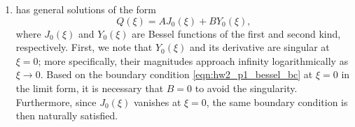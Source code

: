 \begin{enumerate}[(i)]
{\begin{enumerate}[(1)]
{\begin{equation}
\begin{aligned}
        &= k^2n^2 {\left(\frac{\xi}{k}\right)}^{2-\frac{1}{n}} \frac{d^2 Q}{d\xi^2} + kn^2 {\left(\frac{\xi}{k}\right)}^{1-\frac{1}{n}} \frac{dQ}{d\xi} + \frac{\omega^2}{g}Q ~~~~ \left[\textrm{multiply by } \frac{1}{n^2} {\left(\frac{\xi}{k}\right)}^{\frac{1}{n}}\right]\\
        &= \xi^2 \frac{d^2 Q}{d\xi^2} + \xi \frac{d Q}{d\xi} + \frac{\omega^2}{gn^2} {\left(\frac{\xi}{k}\right)}^{\frac{1}{n}} Q
    \end{aligned}
    \end{equation}
    where we set $n = 1/2$ and $k = 2\omega / \sqrt{g}$ to obtain the order-$0$ Bessel ODE 
    \begin{equation}\label{eqn:hw2_p1_bessel_eq}
        \boxed{\xi^2 \frac{d^2 Q}{d\xi^2} + \xi\frac{dQ}{d\xi} + \xi^2 Q = 0}.    
    \end{equation}
    The associated boundary conditions in terms of $Q(\xi)$ are 
    \begin{equation}\label{eqn:hw2_p1_bessel_bc}
        \lim_{\xi \rightarrow 0} \left[\xi \frac{dQ}{d\xi}\right] = 0, ~~~~ Q\left(\xi = 2\omega \sqrt{\frac{L}{g}}\right) = 0
    \end{equation}
}
\item {
     has general solutions of the form 
    \begin{equation}
        Q(\xi) = A J_0(\xi) + B Y_0(\xi),
    \end{equation}
    where $J_0(\xi)$ and $Y_0(\xi)$ are Bessel functions of the first and second kind, respectively.
    First, we note that $Y_0(\xi)$ and its derivative are singular at $\xi = 0$; more specifically, their magnitudes approach infinity logarithmically as $\xi \rightarrow 0$.
    Based on the boundary condition \cref{eqn:hw2_p1_bessel_bc} at $\xi = 0$ in the limit form, it is necessary that $B = 0$ to avoid the singularity. 
    Furthermore, since $J_0(\xi)$ vanishes at $\xi = 0$, the same boundary condition is then naturally satisfied. 

}
\end{enumerate}}
\end{enumerate}
